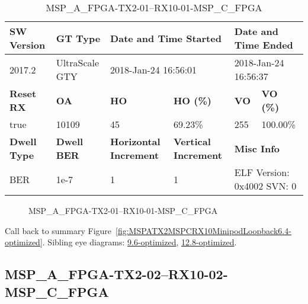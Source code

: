 \begin{table}[h]
\centering
\caption{MSP\_A\_FPGA-TX2-01--RX10-01-MSP\_C\_FPGA}
\label{tab:MSPAFPGATX201RX1001MSPCFPGA6.4-optimized}
\begin{tabular}{@{}|l|l|l|l|l|l|@{}}
\toprule
\textbf{SW Version}                & \textbf{GT Type}   & \multicolumn{2}{l|}{\textbf{Date and Time Started}}            & \multicolumn{2}{l|}{\textbf{Date and Time Ended}}        \\ \midrule
2017.2                       & UltraScale GTY          & \multicolumn{2}{l|}{2018-Jan-24 16:56:01}                   & \multicolumn{2}{l|}{2018-Jan-24 16:56:37}               \\ \midrule
\textbf{Reset RX}                  & \textbf{OA} & \textbf{HO}   & \textbf{HO (\%)} & \textbf{VO} & \textbf{VO (\%)} \\ \midrule
true & 10109        & 45          & 69.23\%        & 255        & 100.00\%       \\ \midrule
\textbf{Dwell Type}                & \textbf{Dwell BER} & \textbf{Horizontal Increment} & \textbf{Vertical Increment}    & \multicolumn{2}{l|}{\textbf{Misc Info}}                  \\ \midrule
BER                            & 1e-7        & 1        & 1           & \multicolumn{2}{l|}{ELF Version: 0x4002 SVN: 0}                         \\ \bottomrule
\end{tabular}
\end{table}

\begin{figure}[h]
\caption{MSP\_A\_FPGA-TX2-01--RX10-01-MSP\_C\_FPGA} \label{fig:MSPAFPGATX201RX1001MSPCFPGA6.4-optimized}
\end{figure}

Call back to summary Figure~\ref{fig:MSPATX2MSPCRX10MinipodLoopback6.4-optimized}.
Sibling eye diagrams: \hyperref[sec:MSPAFPGATX201RX1001MSPCFPGA9.6-optimized]{9.6-optimized}, \hyperref[sec:MSPAFPGATX201RX1001MSPCFPGA12.8-optimized]{12.8-optimized}.

\clearpage
\newpage


\subsection{MSP\_A\_FPGA-TX2-02--RX10-02-MSP\_C\_FPGA}\label{sec:MSPAFPGATX202RX1002MSPCFPGA6.4-optimized}

